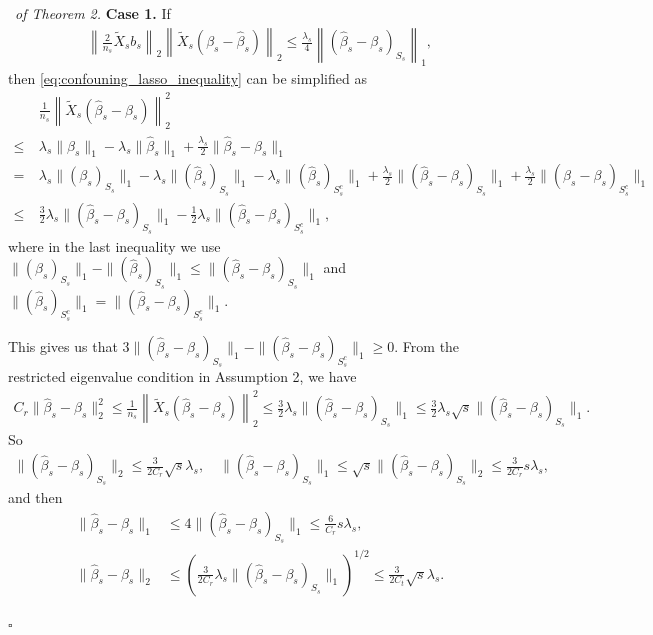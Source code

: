 \documentclass[12pt]{article}
\newenvironment{pf}{{\noindent \it Proof}\ }{\hfill $\square$\par}
\begin{document}
\begin{pf}{\it of Theorem 2. }
    \textbf{Case 1.} If
        \begin{align*}
            \left\|\frac{2}{n_s}\tilde{X}_s b_s\right\|_2\left\|\tilde{X}_s\left(\beta_s - \hat{\beta}_s\right)\right\|_2 \le \frac{\lambda_s}{4}\left\|(\hat{\beta}_s - \beta_s)_{S_s}\right\|_1,
        \end{align*}
         then \eqref{eq:confouning_lasso_inequality} can be simplified as
        \begin{align*}
             & \frac{1}{n_s}\left\|\tilde{X}_s\left(\hat{\beta}_s - \beta_s\right)\right\|_2^2 \\ \le \ & \lambda_s\|\beta_s\|_1 - \lambda_s\|\hat{\beta}_s\|_1 +\frac{\lambda_s}{2}\|\hat{\beta}_s - \beta_s\|_1\\= \ & 
             \lambda_s\|(\beta_s)_{S_s}\|_1 - \lambda_s\|(\hat{\beta}_s)_{S_s}\|_1 - \lambda_s\|(\hat{\beta}_s)_{S^c_s}\|_1 + \frac{\lambda_s}{2}\|(\hat{\beta}_s - \beta_s)_{S_s}\|_1 + \frac{\lambda_s}{2}\|(\hat{\beta}_s - \beta_s)_{S_s^c}\|_1 \\\le \ & 
             \frac{3}{2}\lambda_s\|(\hat{\beta}_s - \beta_s)_{S_s}\|_1 - \frac{1}{2}\lambda_s\|(\hat{\beta}_s - \beta_s)_{S_s^c}\|_1,
             \end{align*}
             where in the last inequality we use $\|(\beta_s)_{S_s}\|_1 - \|(\hat{\beta}_s)_{S_s}\|_1 \le \|(\hat{\beta}_s - \beta_s)_{S_s}\|_1$ and $\|(\hat{\beta}_s)_{S_s^c}\|_1 = \|(\hat{\beta}_s - \beta_s)_{S_s^c}\|_1$.

        This gives us that $ 3\|(\hat{\beta}_s - \beta_s)_{S_s}\|_1 - \|(\hat{\beta}_s - \beta_s)_{S_s^c}\|_1\ge 0$. From the restricted eigenvalue condition in Assumption 2, we have
        \begin{align*}
            C_r\|\hat{\beta}_s - \beta_s\|_2^2 \le \frac{1}{n_s}\left\|\tilde{X}_s\left(\hat{\beta}_s - \beta_s\right)\right\|_2^2 \le \frac{3}{2}\lambda_s\|(\hat{\beta}_s - \beta_s)_{S_s}\|_1\le \frac{3}{2}\lambda_s\sqrt{s}\|(\hat{\beta}_s - \beta_s)_{S_s}\|_1. 
        \end{align*}
        So
        \begin{align*}
            \|(\hat{\beta}_s - \beta_s)_{S_s}\|_2 \le \frac{3}{2C_r}\sqrt{s}\lambda_s,\quad \|(\hat{\beta}_s - \beta_s)_{S_s}\|_1 \le \sqrt{s} \|(\hat{\beta}_s - \beta_s)_{S_s}\|_2\le \frac{3}{2C_r}s\lambda_s,
        \end{align*}
        and then
        \begin{equation}
        \label{eq:case1_error}
            \begin{aligned}
            \|\hat{\beta}_s - \beta_s\|_1 & \le 4 \|(\hat{\beta}_s - \beta_s)_{S_s}\|_1 \le \frac{6}{C_r}s\lambda_s, \\
            \|\hat{\beta}_s - \beta_s\|_2 &\le \left(\frac{3}{2C_r}\lambda_s \|(\hat{\beta}_s - \beta_s)_{S_s}\|_1\right)^{1/2} \le \frac{3}{2C_t}\sqrt{s}\lambda_s. 
            \end{aligned}
        \end{equation}


\end{pf}
\end{document}
